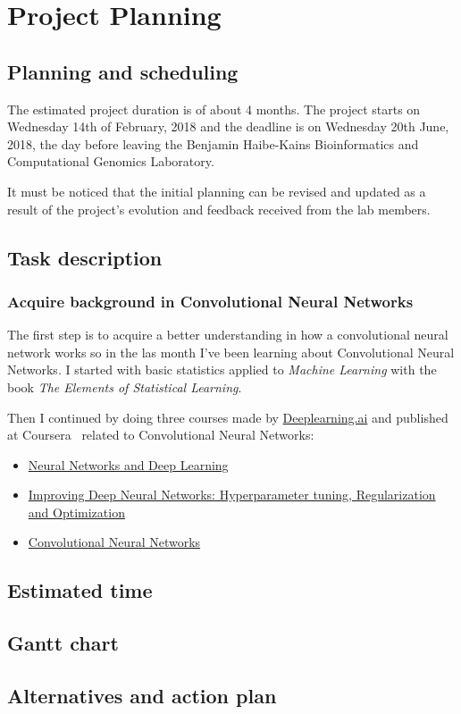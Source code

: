 

\section{Project Planning}

\subsection{Planning and scheduling}

The estimated project duration is of about 4 months. The project starts on Wednesday 14th of 
February, 2018 and the deadline is on Wednesday 20th June, 2018, the day before leaving the 
Benjamin Haibe-Kains Bioinformatics and Computational Genomics Laboratory.

It must be noticed that the initial planning can be revised and updated as a result of the 
project's evolution and feedback received from the lab members. 

\subsection{Task description}

\subsubsection{Acquire background in Convolutional Neural Networks}

The first step is to acquire a better understanding in how a convolutional neural network works
so in the las month I've been learning about Convolutional Neural Networks. I started with 
basic statistics applied to \emph{Machine Learning} with the book \emph{The Elements of 
Statistical Learning}.~\cite{ElementsStatisticalLearning}

Then I continued by doing three courses made by \href{https://www.deeplearning.ai}{Deeplearning.ai}
and published at Coursera~\cite{Coursera} related to Convolutional Neural Networks:

\begin{itemize}
    \item \href{https://www.coursera.org/learn/neural-networks-deep-learning}{Neural Networks and 
        Deep Learning}~\cite{Coursera:NN}
    \item \href{https://www.coursera.org/learn/deep-neural-network}{Improving Deep Neural Networks: 
    Hyperparameter tuning, Regularization and Optimization}~\cite{Coursera:NNHyperparameters}
    \item \href{https://www.coursera.org/learn/convolutional-neural-networks}{Convolutional Neural 
        Networks}~\cite{Coursera:CNN}
\end{itemize}


\subsection{Estimated time}

\subsection{Gantt chart}

\subsection{Alternatives and action plan}

